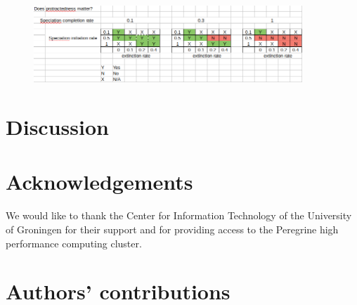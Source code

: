 \documentclass{article}
\begin{document}
\begin{figure}[]
  \includegraphics[width=0.9\textwidth]{fig_does_protractedness_matter.png}
\end{figure}

\section{Discussion}


\section{Acknowledgements}

We would like to thank the Center for Information Technology of the University of Groningen for their support
and for providing access to the Peregrine high performance computing cluster.

\section{Authors' contributions}




\appendix
\end{document}
